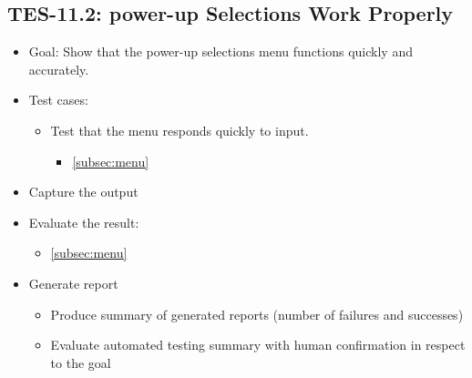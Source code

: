 \subsection{TES-11.2: power-up Selections Work Properly }
\begin{itemize}
\item Goal: Show that the power-up selections menu functions quickly and accurately.

\item Test cases: 
\begin{itemize}
\item Test that the menu responds quickly to input.
\begin{itemize}
\item \ref{subsec:menu}
\end{itemize}
\end{itemize}

\item Capture the output 

\item Evaluate the result: 
\begin{itemize}
\item \ref{subsec:menu}
\end{itemize}

\item Generate report 
\begin{itemize}
\item Produce summary of generated reports (number of failures and successes)
\item Evaluate automated testing summary with human confirmation in respect to the goal
\end{itemize} 
\end{itemize}

